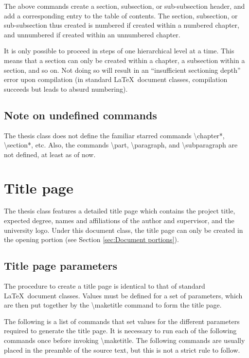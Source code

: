 \documentclass[twoside,openany]{thesis}
\begin{document}
The above commands create a section, subsection, or sub-subsection header, and add a corresponding entry to the table of contents.
The section, subsection, or sub-subsection thus created is numbered if created within a numbered chapter, and unnumbered if created within an unnumbered chapter.

It is only possible to proceed in steps of one hierarchical level at a time.
This means that a section can only be created within a chapter, a subsection within a section, and so on.
Not doing so will result in an ``insufficient sectioning depth'' error upon compilation (in standard \LaTeX\ document classes, compilation succeeds but leads to absurd numbering).

\section{Note on undefined commands}\label{sec:Note on undefined commands}

The {\ttfamily thesis} class does not define the familiar starred commands {\ttfamily\textbackslash chapter*}, {\ttfamily\textbackslash section*}, etc.
Also, the commands {\ttfamily\textbackslash part}, {\ttfamily\textbackslash paragraph}, and {\ttfamily\textbackslash subparagraph} are not defined, at least as of now.

\chapter{Title page}\label{ch:Title page}

The {\ttfamily thesis} class features a detailed title page which contains the project title, expected degree, names and affiliations of the author and supervisor, and the university logo.
Under this document class, the title page can only be created in the opening portion (see Section \ref{sec:Document portions}).

\section{Title page parameters}\label{sec:Title page parameters}

The procedure to create a title page is identical to that of standard \LaTeX\ document classes.
Values must be defined for a set of parameters, which are then put together by the {\ttfamily\textbackslash maketitle} command to form the title page.

The following is a list of commands that set values for the different parameters required to generate the title page.
It is necessary to run each of the following commands once before invoking {\ttfamily\textbackslash maketitle}.
The following commands are usually placed in the preamble of the source text, but this is not a strict rule to follow.
\end{document}
